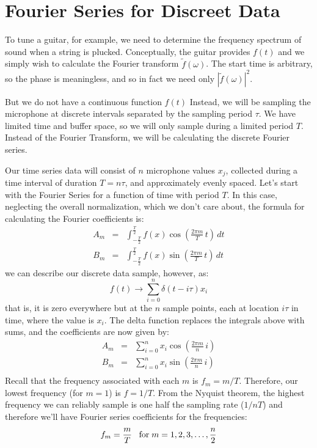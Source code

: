 \documentclass[12pt]{article}
\begin{document}
\section{Fourier Series for Discreet Data}

To tune a guitar, for example, we need to determine the frequency spectrum of sound when a string is plucked.   Conceptually, the guitar provides $f(t)$ and we simply wish to calculate the Fourier transform $\widetilde{f}(\omega)$.  The start time is arbitrary, so the phase is meaningless, and so in fact we need only 
$|\widetilde{f}(\omega)|^2$.

But we do not have a continuous function $f(t)$   Instead, we will be sampling the microphone at discrete intervals separated by the sampling period $\tau$.  We have limited time and buffer space, so we will only sample during a limited period $T$.  Instead of the Fourier Transform, we will be calculating the discrete Fourier series.

Our time series data will consist of $n$ microphone values $x_j$, collected during a time interval of duration $T = n\tau$, and approximately evenly spaced.    Let's start with the Fourier Series for a function of time with period $T$.  In this case, neglecting the overall normalization, which we don't care about, the formula for calculating the Fourier coefficients is:
\begin{eqnarray*}
A_m &=&  \int_{-\frac{T}{2}}^{\frac{T}{2}} 
f(x) \cos\left(\frac{2\pi m}{T} \, t \right) \, dt \\
B_m &=& \int_{-\frac{T}{2}}^{\frac{T}{2}} 
f(x) \sin\left(\frac{2\pi m}{T} \, t \right) \, dt
\end{eqnarray*}
we can describe our discrete data sample, however, as:
\begin{equation*}
f(t) \to \sum_{i=0}^n \delta(t-i\tau) x_i
\end{equation*}
that is, it is zero everywhere but at the $n$ sample points, each at location $i\tau$ in time, where the value is $x_i$.
The delta function replaces the integrals above with sums, and the coefficients are now given by:
\begin{eqnarray*}
A_m &=&  \sum_{i=0}^n x_i  \cos\left(\frac{2\pi m}{n} \, i \right) \\
B_m &=&  \sum_{i=0}^n x_i  \sin\left(\frac{2\pi m}{n} \, i \right) \\
\end{eqnarray*}
Recall that the frequency associated with each $m$ is $f_m = m / T$.  Therefore, our lowest frequency (for $m=1$) is $f=1/T$.  From the Nyquist theorem, the highest frequency we can reliably sample is one half the sampling rate ($1/nT$) and therefore we'll have Fourier series coefficients for the frequencies:
\begin{displaymath}
f_m = \frac{m}{T} \; \; \; {\rm for} \; m=1,2,3,\ldots,\frac{n}{2}
\end{displaymath}
\end{document}
